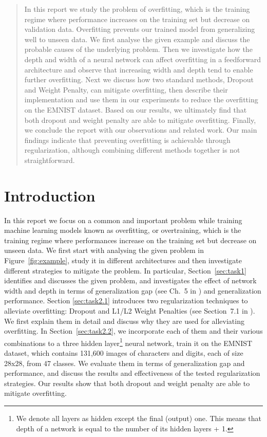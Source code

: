 \documentclass{article}
\begin{document}
 



\begin{abstract} 
In this report we study the problem of overfitting, which is the training regime where performance increases on the training set but decrease on validation data. Overfitting prevents our trained model from generalizing well to unseen data.
We first analyse the given example and discuss the probable causes of the underlying problem. 
Then we investigate how the depth and width of a neural network can affect overfitting in a feedforward architecture and observe that increasing width and depth tend to enable further overfitting.
Next we discuss how two standard methods, Dropout and Weight Penalty, can
mitigate overfitting, then describe their implementation and use them in our experiments
to reduce the overfitting on the EMNIST dataset. 
Based on our results, we ultimately find that both dropout and weight penalty are able to mitigate overfitting.
Finally, we conclude the report with our observations and related work. 
Our main findings indicate that preventing overfitting is achievable through regularization, although combining different methods together is not straightforward.
\end{abstract} 


\section{Introduction}
\label{sec:intro}
In this report we focus on a common and important problem while training machine learning models known as overfitting, or overtraining, which is the training regime where performances increase on the training set but decrease on unseen data.
We first start with analysing the given problem in Figure~\ref{fig:example}, study it in different architectures and then investigate different strategies to mitigate the problem.
In particular, Section~\ref{sec:task1} identifies and discusses the given problem, and investigates the effect of network width and depth in terms of generalization gap (see Ch.~5 in \citealt{Goodfellow-et-al-2016}) and generalization performance.
Section \ref{sec:task2.1} introduces two regularization techniques to alleviate overfitting: Dropout \cite{srivastava2014dropout} and L1/L2 Weight Penalties (see Section~7.1 in \citealt{Goodfellow-et-al-2016}). 
We first explain them in detail and discuss why they are used for alleviating overfitting.
In Section~\ref{sec:task2.2}, we incorporate each of them and their various combinations to a three hidden layer\footnote{We denote all layers as hidden except the final (output) one. This means that depth of a network is equal to the number of its hidden layers + 1.} neural network, train it on the EMNIST dataset, which contains 131,600 images of characters and digits, each of size 28x28, from 47 classes.
We evaluate them in terms of generalization gap and performance, and discuss the results and effectiveness of the tested regularization strategies.
Our results show that both dropout and weight penalty are able to mitigate overfitting.
\end{document}
